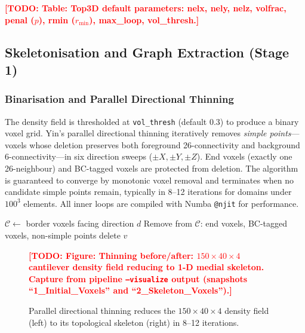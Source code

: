 \documentclass[11pt,a4paper]{article}
\newcommand{\TODO}[1]{\textcolor{red}{\textbf{[TODO: #1]}}}
\newcommand{\figstub}[2]{%
  \begin{figure}[htbp]\centering
    \TODO{Figure: #1}\caption{#2}\end{figure}}
\newcommand{\tblstub}[1]{\TODO{Table: #1}}
\begin{document}
\tblstub{Top3D default parameters: nelx, nely, nelz, volfrac, penal ($p$),
rmin ($r_{\min}$), max\_loop, vol\_thresh.}

\subsection{Skeletonisation and Graph Extraction (Stage 1)}
\label{subsec:skel}

\subsubsection{Binarisation and Parallel Directional Thinning}

The density field is thresholded at \texttt{vol\_thresh} (default 0.3) to
produce a binary voxel grid.
Yin's parallel directional thinning \cite{yin2020} iteratively removes
\emph{simple points}---voxels whose deletion preserves both foreground
26-connectivity and background 6-connectivity---in six direction sweeps
($\pm X, \pm Y, \pm Z$).
End voxels (exactly one 26-neighbour) and BC-tagged voxels are protected from
deletion.
The algorithm is guaranteed to converge by monotonic voxel removal and
terminates when no candidate simple points remain, typically in 8--12 iterations
for domains under $100^3$ elements.
All inner loops are compiled with Numba \texttt{@njit} for performance.

\begin{algorithm}[htbp]
\caption{Parallel directional thinning with BC protection}
\label{alg:thinning}
\begin{algorithmic}[1]
\Repeat
    \State $\mathcal{C} \gets$ border voxels facing direction $d$
    \State Remove from $\mathcal{C}$: end voxels, BC-tagged voxels,
           non-simple points
     
        \State delete $v$
      \EndIf
    \EndFor
  \EndFor
{}
\end{algorithmic}
\end{algorithm}

\figstub{Thinning before/after: $150\times40\times4$ cantilever density field
  reducing to 1-D medial skeleton. Capture from pipeline \texttt{--visualize}
  output (snapshots ``1\_Initial\_Voxels'' and ``2\_Skeleton\_Voxels'').}{
  Parallel directional thinning reduces the $150\times40\times4$ density field
  (left) to its topological skeleton (right) in 8--12 iterations.}
\end{document}
